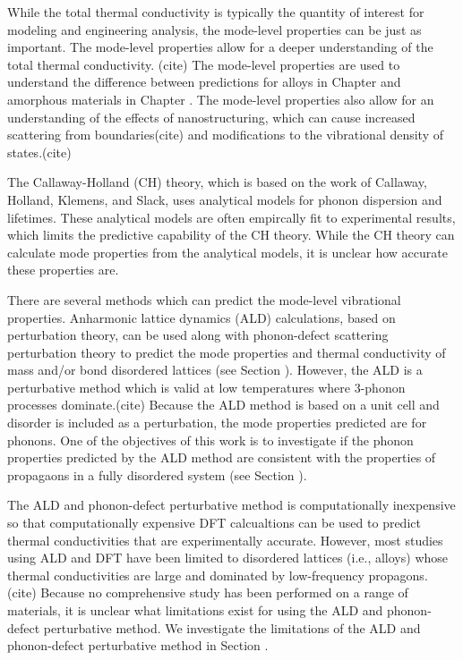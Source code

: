 While the total thermal conductivity is typically the quantity of 
interest for modeling and engineering analysis, the mode-level 
properties can be just as important. The mode-level properties 
allow for a deeper understanding of the total thermal conductivity.
(cite) 
The mode-level properties are used to understand the difference 
between predictions for alloys in Chapter and amorphous 
materials in Chapter . The mode-level properties also allow for an 
understanding of the effects of nanostructuring, which can cause 
increased scattering from boundaries(cite) and modifications to the 
vibrational density of states.(cite)

The Callaway-Holland (CH) theory, which is based on the work of 
Callaway,\cite{callaway_model_1959} Holland,
\cite{holland_analysis_1963} Klemens,\cite{klemens_scattering_1955} 
and Slack,\cite{slack_thermal_1979} uses analytical models for phonon 
dispersion and lifetimes. These analytical models are often empircally 
fit to experimental results, which limits the predictive capability of 
the CH theory. While the CH theory can calculate mode properties 
from the analytical models, it is unclear how accurate these properties 
are.

There are several methods which can predict the mode-level vibrational 
properties. 
Anharmonic lattice dynamics (ALD) calculations,
\cite{turney_predicting_2009,esfarjani_heat_2011} 
based on perturbation 
theory,\cite{maradudin_dynamical_1974,srivastava_physics_1990} 
can be used along with phonon-defect scattering perturbation 
theory to predict the mode properties and thermal conductivity 
of mass and/or bond disordered lattices (see Section ).
\cite{klemens_scattering_1955,klemens_thermal_1957,mattis_phonon_1957,
tamura_isotope_1983} 
However, the ALD is a perturbative method which is valid at low 
temperatures where 3-phonon processes dominate.(cite) 
Because the ALD method is based on a unit cell 
and disorder is included as a perturbation, the mode properties 
predicted are for phonons. One of the objectives of this work is 
to investigate if the phonon properties predicted by the ALD method 
are consistent with the properties of propagaons in a fully 
disordered system (see Section ). 

The ALD and phonon-defect perturbative method is computationally 
inexpensive so that 
computationally expensive DFT calcualtions can be used to predict 
thermal conductivities that are experimentally accurate.
\cite{garg_role_2011,lindsay_thermal_2012,li_thermal_2012} 
However, most studies using ALD and DFT have been limited to 
disordered lattices (i.e., alloys) whose thermal conductivities 
are large and dominated by low-frequency propagons.
(cite) 
Because no comprehensive study has been performed on a range 
of materials, it is unclear what limitations exist for using the ALD and 
phonon-defect perturbative method.
\cite{luckyanova_coherent_2012,tian_phonon_2012,tian_enhancing_2012} 
We investigate the limitations of the ALD and phonon-defect perturbative 
method in Section . 

